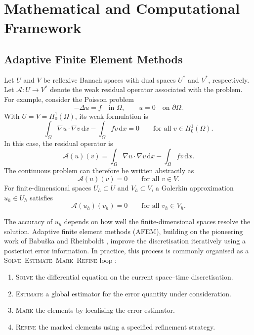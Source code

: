 \chapter{Mathematical and Computational Framework}
\label{chap:background}


\section{Adaptive Finite Element Methods}
\label{sec:background-afem}

Let \(U\) and \(V\) be reflexive Banach spaces with dual spaces \(U^\ast\) and \(V^\ast\), respectively. Let \(\mathcal{A}:U\rightarrow V^\ast\) denote the weak residual operator associated with the problem.
For example, consider the Poisson problem
\[
-\Delta u=f \quad \text{in }\Omega,
\qquad
u=0 \quad \text{on }\partial\Omega.
\]
With \(U=V=H_0^1(\Omega)\), its weak formulation is
\[
\int_\Omega \nabla u\cdot\nabla v\,\mathrm{d}x
-\int_\Omega f v\,\mathrm{d}x=0
\qquad\text{for all }v\in H_0^1(\Omega).
\]
In this case, the residual operator is
\[
\mathcal{A}(u)(v)
=
\int_\Omega \nabla u\cdot\nabla v\,\mathrm{d}x
-\int_\Omega f v\,\mathrm{d}x.
\]
The continuous problem can therefore be written abstractly as
\begin{equation}
  \mathcal{A}(u)(v)=0
  \qquad\text{for all }v\in V.
  \label{eq:abstract-primal}
\end{equation}
For finite-dimensional spaces \(U_h\subset U\) and \(V_h\subset V\), a Galerkin approximation \(u_h\in U_h\) satisfies
\begin{equation}
  \mathcal{A}(u_h)(v_h)=0
  \qquad\text{for all }v_h\in V_h.
  \label{eq:abstract-discrete-primal}
\end{equation}

The accuracy of \(u_h\) depends on how well the finite-dimensional spaces resolve the solution. Adaptive finite element methods (AFEM), building on the pioneering work of Babuška and Rheinboldt \cite{pioneer}, improve the discretisation iteratively using a posteriori error information. In practice, this process is commonly organised as a \textsc{Solve--Estimate--Mark--Refine} loop \cite{carstensen2014axioms}:
\begin{enumerate}
  \item \textsc{Solve} the differential equation on the current space--time discretisation.
  \item \textsc{Estimate} a global estimator for the error quantity under consideration.
  \item \textsc{Mark} the elements by localising the error estimator.
  \item \textsc{Refine} the marked elements using a specified refinement strategy.
\end{enumerate}

